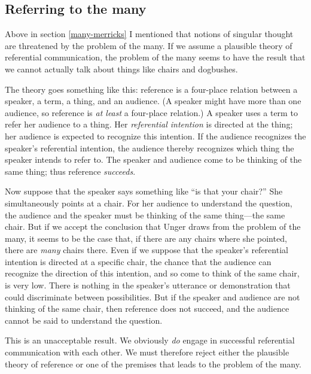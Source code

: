 \documentclass[11pt]{article}
\begin{document}
\begin{spacing}{1.5}
\section{Referring to the many}
\label{refer}
Above in section \ref{many-merricks} I mentioned that notions of
singular thought are threatened by the problem of the many.  If we
assume a plausible theory of referential communication, the problem of
the many seems to have the result that we cannot actually talk about
things like chairs and dogbushes.

The theory goes something like this: reference is a four-place
relation between a speaker, a term, a thing, and an audience.  (A
speaker might have more than one audience, so reference is {\em at
  least} a four-place relation.)  A speaker uses a term to refer her
audience to a thing.  Her {\em referential intention} is directed at
the thing; her audience is expected to recognize this intention.  If
the audience recognizes the speaker's referential intention, the
audience thereby recognizes which thing the speaker intends to refer
to.  The speaker and audience come to be thinking of the same thing;
thus reference {\em succeeds}.

Now suppose that the speaker says something like ``is that your
chair?''  She simultaneously points at a chair.  For her audience to
understand the question, the audience and the speaker must be thinking
of the same thing---the same chair.  But if we accept the conclusion
that Unger draws from the problem of the many, it seems to be the case
that, if there are any chairs where she pointed, there are {\em many}
chairs there.  Even if we suppose that the speaker's referential
intention is directed at a specific chair, the chance that the
audience can recognize the direction of this intention, and so come to
think of the same chair, is very low.  There is nothing in the
speaker's utterance or demonstration that could discriminate between
possibilities.  But if the speaker and audience are not thinking of
the same chair, then reference does not succeed, and the audience
cannot be said to understand the question.

This is an unacceptable result.  We obviously {\em do} engage in
successful referential communication with each other.  We must
therefore reject either the plausible theory of reference or one of
the premises that leads to the problem of the many.


\end{spacing}
\end{document}
